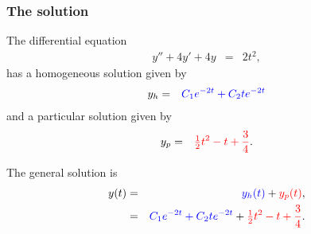 \begin{frame}
  \frametitle{The  solution}


  The differential equation
  \begin{eqnarray*}
    y'' + 4y' + 4y & = & 2t^2,
  \end{eqnarray*}
  has a homogeneous solution given by
  \begin{eqnarray*}
    y_h & = & {\color{blue}C_1 e^{-2t} + C_2 t e^{-2t}}
  \end{eqnarray*}
  and a particular solution given by
  \begin{eqnarray*}
    y_p & = & {\color{red}\mbox{$\frac{1}{2}$} t^2 - t + \frac{3}{4}}.
  \end{eqnarray*}

  The general solution is
  \begin{eqnarray*}
    y(t) & = & {\color{blue}y_h(t)} + {\color{red}y_p(t)}, \\
         & = & {\color{blue}C_1 e^{-2t} + C_2 t e^{-2t}} + {\color{red}\mbox{$\frac{1}{2}$} t^2 - t + \frac{3}{4}}.
  \end{eqnarray*}

\end{frame}


